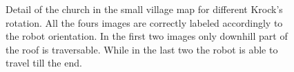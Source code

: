 \documentclass[../document.tex]{subfiles}
\begin{document}
\begin{figure} [htbp]
\begin{subfigure}[b]{0.45\textwidth}
    \end{subfigure}
    \caption{Detail of the church in the small village map for different Krock's rotation. All the fours images are correctly labeled accordingly to the robot orientation. In the first two images only downhill part of the roof is traversable. While in the last two the robot is able to travel till the end.}
    \label{fig :  small-village-roof-trav}
    \end{figure}
\end{document}
